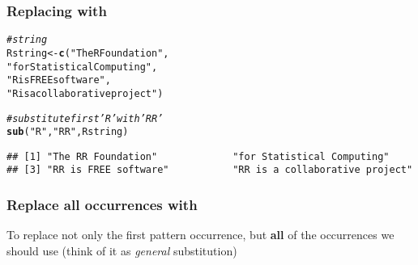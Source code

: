 \documentclass[12pt]{beamer}\usepackage[]{graphicx}\usepackage[]{color}
\makeatletter
\newcommand{\hlstr}[1]{\textcolor[rgb]{0.192,0.494,0.8}{#1}}%
\newcommand{\hlcom}[1]{\textcolor[rgb]{0.678,0.584,0.686}{\textit{#1}}}%
\newcommand{\hlstd}[1]{\textcolor[rgb]{0.345,0.345,0.345}{#1}}%
\newcommand{\hlkwb}[1]{\textcolor[rgb]{0.69,0.353,0.396}{#1}}%
\newcommand{\hlkwd}[1]{\textcolor[rgb]{0.737,0.353,0.396}{\textbf{#1}}}%
\newenvironment{kframe}{%
 \def\at@end@of@kframe{}%
 \ifinner\ifhmode%
  \def\at@end@of@kframe{\end{minipage}}%
  \begin{minipage}{\columnwidth}%
 \fi\fi%
 \def\FrameCommand##1{\hskip\@totalleftmargin \hskip-\fboxsep
 \colorbox{shadecolor}{##1}\hskip-\fboxsep
     \hskip-\linewidth \hskip-\@totalleftmargin \hskip\columnwidth}%
 \MakeFramed {\advance\hsize-\width
   \@totalleftmargin\z@ \linewidth\hsize
   \@setminipage}}%
 {\par\unskip\endMakeFramed%
 \at@end@of@kframe}
\newenvironment{knitrout}{}{} %
\makeatother
\begin{document}

\begin{frame}[fragile]
\frametitle{Replacing with }

\begin{knitrout}\scriptsize
{}\color{fgcolor}\begin{kframe}
\begin{alltt}
\hlcom{# string}
\hlstd{Rstring} \hlkwb{<-} \hlkwd{c}\hlstd{(}\hlstr{"The R Foundation"}\hlstd{,}
            \hlstr{"for Statistical Computing"}\hlstd{,}
            \hlstr{"R is FREE software"}\hlstd{,}
            \hlstr{"R is a collaborative project"}\hlstd{)}

\hlcom{# substitute first 'R' with 'RR'}
\hlkwd{sub}\hlstd{(}\hlstr{"R"}\hlstd{,} \hlstr{"RR"}\hlstd{, Rstring)}
\end{alltt}
\begin{verbatim}
## [1] "The RR Foundation"             "for Statistical Computing"    
## [3] "RR is FREE software"           "RR is a collaborative project"
\end{verbatim}
\end{kframe}
\end{knitrout}

\end{frame}


\begin{frame}
\frametitle{Replace all occurrences with }

To replace not only the first pattern occurrence, but \textbf{all} of the occurrences we should use {\hilit {}} (think of it as \textit{general} substitution)

\end{frame}

\end{document}
